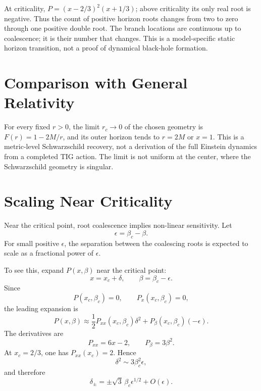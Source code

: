 \documentclass[11pt,a4paper]{article}
\begin{document}
At criticality, \(P=(x-2/3)^2(x+1/3)\); above criticality its only real root
is negative. Thus the count of positive horizon roots changes from two to zero
through one positive double root. The branch locations are continuous up to
coalescence; it is their number that changes. This is a model-specific static
horizon transition, not a proof of dynamical black-hole formation.

\section{Comparison with General Relativity}

For every fixed \(r>0\), the limit \(r_c\to0\) of the chosen geometry is
\(F(r)=1-2M/r\), and its outer horizon tends to \(r=2M\) or \(x=1\).
This is a metric-level Schwarzschild recovery, not a derivation of the full
Einstein dynamics from a completed TIG action. The limit is not uniform at the
center, where the Schwarzschild geometry is singular.

\section{Scaling Near Criticality}

Near the critical point, root coalescence implies non-linear sensitivity. Let
\begin{equation}
\epsilon = \beta_c-\beta.
\end{equation}
For small positive \(\epsilon\), the separation between the coalescing roots is
expected to scale as a fractional power of \(\epsilon\).

To see this, expand \(P(x,\beta)\) near the critical point:
\begin{equation}
x=x_c+\delta,
\qquad
\beta=\beta_c-\epsilon.
\end{equation}
Since
\begin{equation}
P(x_c,\beta_c)=0,
\qquad
P_x(x_c,\beta_c)=0,
\end{equation}
the leading expansion is
\begin{equation}
P(x,\beta)
\approx
\frac{1}{2}P_{xx}(x_c,\beta_c)\delta^2
+
P_{\beta}(x_c,\beta_c)(-\epsilon).
\end{equation}
The derivatives are
\begin{equation}
P_{xx}=6x-2,
\qquad
P_{\beta}=3\beta^2.
\end{equation}
At \(x_c=2/3\), one has \(P_{xx}(x_c)=2\). Hence
\begin{equation}
\delta^2\sim 3\beta_c^2\epsilon,
\end{equation}
and therefore
\begin{equation}
\delta_\pm=\pm\sqrt{3}\,\beta_c\epsilon^{1/2}+O(\epsilon).
\label{eq:sqrt_scaling}
\end{equation}
\end{document}
